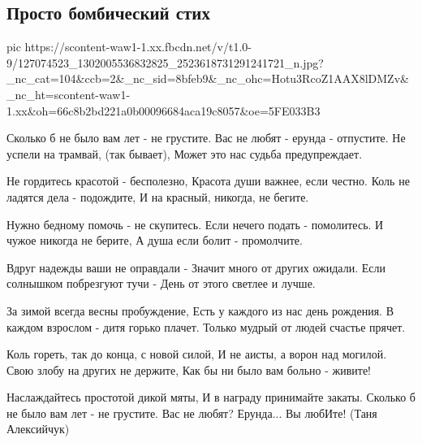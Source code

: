  
 
 

\subsection{Просто бомбический стих}
\label{sec:23_11_2020.fb.tainy_sudby.1.bombicheskii_stih}


\ifcmt
pic https://scontent-waw1-1.xx.fbcdn.net/v/t1.0-9/127074523_1302005536832825_2523618731291241721_n.jpg?_nc_cat=104&ccb=2&_nc_sid=8bfeb9&_nc_ohc=Hotu3RcoZ1AAX8lDMZv&_nc_ht=scontent-waw1-1.xx&oh=66c8b2bd221a0b00096684aca19c8057&oe=5FE033B3
\fi

\begin{multicols}{2}
	\obeycr
Сколько б не было вам лет - не грустите.
Вас не любят - ерунда - отпустите.
Не успели на трамвай, (так бывает),
Может это нас судьба предупреждает.

Не гордитесь красотой - бесполезно,
Красота души важнее, если честно.
Коль не ладятся дела - подождите,
И на красный, никогда, не бегите.

Нужно бедному помочь - не скупитесь. 
Если нечего подать - помолитесь.
И чужое никогда не берите,
А душа если болит - промолчите.

Вдруг надежды ваши не оправдали -
Значит много от других ожидали.
Если солнышком побрезгуют тучи -
День от этого светлее и лучше.

За зимой всегда весны пробуждение,
Есть у каждого из нас день рождения.
В каждом взрослом - дитя горько плачет.
Только  мудрый от людей счастье прячет.

Коль гореть, так до конца, с новой силой,
И не аисты, а ворон над могилой.
Свою злобу на других не держите,
Как бы ни было вам больно - живите!

Наслаждайтесь простотой дикой мяты,
И в награду принимайте закаты.
Сколько б не было вам лет - не грустите.
Вас не любят? Ерунда... Вы любИте!
(Таня Алексийчук)
	\restorecr
\end{multicols}
